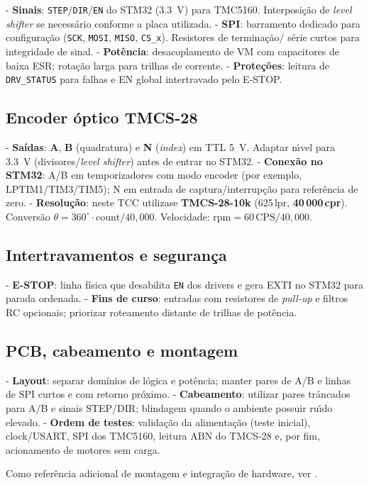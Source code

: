 - \textbf{Sinais}: \texttt{STEP}/\texttt{DIR}/\texttt{EN} do STM32 (\SI{3.3}{V})
  para TMC5160. Interposi\c{c}\~ao de \emph{level shifter} se necess\'ario
  conforme a placa utilizada.
- \textbf{SPI}: barramento dedicado para configura\c{c}\~ao (\texttt{SCK},
  \texttt{MOSI}, \texttt{MISO}, \texttt{CS\_x}). Resistores de termina\c{c}\~ao/
  s\'erie curtos para integridade de sinal.
- \textbf{Pot\^encia}: desacoplamento de VM com capacitores de baixa ESR;
  rota\c{c}\~ao larga para trilhas de corrente.
- \textbf{Prote\c{c}\~oes}: leitura de \texttt{DRV\_STATUS} para falhas e EN
  global intertravado pelo E-STOP.

\subsection{Encoder \'{o}ptico TMCS-28}

- \textbf{Sa\'idas}: \textbf{A}, \textbf{B} (quadratura) e \textbf{N}
  (\emph{index}) em TTL \SI{5}{V}. Adaptar n\'{\i}vel para \SI{3.3}{V}
  (divisores/\emph{level shifter}) antes de entrar no STM32.
- \textbf{Conex\~ao no STM32}: A/B em temporizadores com modo encoder
  (por exemplo, LPTIM1/TIM3/TIM5); N em entrada de captura/interrup\c{c}\~ao para
  refer\^encia de zero.
- \textbf{Resolu\c{c}\~ao}: neste TCC utiliza\-se \textbf{TMCS-28-10k}
  (625\,lpr, \textbf{40\,000\,cpr}). Convers\~ao \(\theta = 360^{\circ}\cdot
  \text{count}/40{,}000\). Velocidade: \(\text{rpm} = 60\,\text{CPS}/40{,}000\).

\subsection{Intertravamentos e seguran\c{c}a}

- \textbf{E-STOP}: linha f\'isica que desabilita \texttt{EN} dos drivers e
  gera EXTI no STM32 para parada ordenada.
- \textbf{Fins de curso}: entradas com resistores de \emph{pull-up}
  e filtros RC opcionais; priorizar roteamento distante de trilhas de
  pot\^encia.

\subsection{PCB, cabeamento e montagem}

- \textbf{Layout}: separar dom\'inios de l\'ogica e pot\^encia; manter
  pares de A/B e linhas de SPI curtos e com retorno pr\'oximo.
- \textbf{Cabeamento}: utilizar pares tr\'ancados para A/B e sinais STEP/DIR;
  blindagem quando o ambiente possuir ru\'{\i}do elevado.
- \textbf{Ordem de testes}: valida\c{c}\~ao da alimenta\c{c}\~ao (teste inicial),
  clock/USART, SPI dos TMC5160, leitura ABN do TMCS-28 e, por fim,
  acionamento de motores sem carga.

Como refer\^encia adicional de montagem e integra\c{c}\~ao de hardware, ver
\cite{romeros_tcc_ifmg_2022}.
